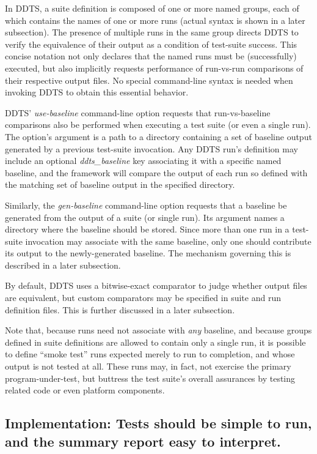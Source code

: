 \documentclass[conference]{IEEEtran}
\begin{document}
In DDTS, a suite definition is composed of one or more named groups, each of which contains the names of one or more runs (actual syntax is shown in a later subsection). The presence of multiple runs in the same group directs DDTS to verify the equivalence of their output as a condition of test-suite success. This concise notation not only declares that the named runs must be (successfully) executed, but also implicitly requests performance of run-vs-run comparisons of their respective output files. No special command-line syntax is needed when invoking DDTS to obtain this essential behavior.

DDTS' \emph{use-baseline} command-line option requests that run-vs-baseline comparisons also be performed when executing a test suite (or even a single run). The option's argument is a path to a directory containing a set of baseline output generated by a previous test-suite invocation. Any DDTS run's definition may include an optional \emph{ddts\_baseline} key associating it with a specific named baseline, and the framework will compare the output of each run so defined with the matching set of baseline output in the specified directory.

Similarly, the \emph{gen-baseline} command-line option requests that a baseline be generated from the output of a suite (or single run). Its argument names a directory where the baseline should be stored. Since more than one run in a test-suite invocation may associate with the same baseline, only one should contribute its output to the newly-generated baseline. The mechanism governing this is described in a later subsection.

By default, DDTS uses a bitwise-exact comparator to judge whether output files are equivalent, but custom comparators may be specified in suite and run definition files. This is further discussed in a later subsection.

Note that, because runs need not associate with \emph{any} baseline, and because groups defined in suite definitions are allowed to contain only a single run, it is possible to define ``smoke test'' runs expected merely to run to completion, and whose output is not tested at all. These runs may, in fact, not exercise the primary program-under-test, but buttress the test suite's overall assurances by testing related code or even platform components.

\subsection{Implementation: Tests should be simple to run, and the summary report easy to interpret.}
\end{document}
